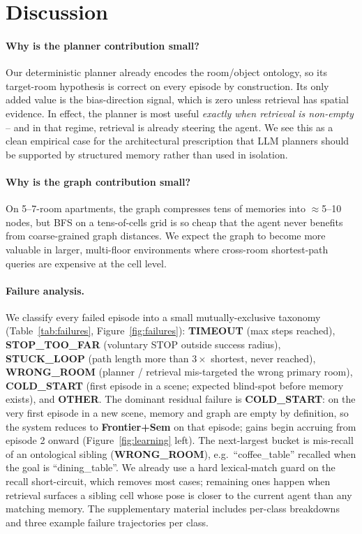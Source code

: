 \documentclass[conference,a4paper,10pt]{IEEEtran}
\begin{document}
\section{Discussion}

\paragraph{Why is the planner contribution small?}
Our deterministic planner already encodes the room/object ontology, so
its target-room hypothesis is correct on every episode by construction.
Its only added value is the bias-direction signal, which is zero unless
retrieval has spatial evidence. In effect, the planner is most useful
\emph{exactly when retrieval is non-empty} -- and in that regime,
retrieval is already steering the agent. We see this as a clean
empirical case for the architectural prescription that LLM planners
should be supported by structured memory rather than used in isolation.

\paragraph{Why is the graph contribution small?}
On 5--7-room apartments, the graph compresses tens of memories into
$\approx$5--10 nodes, but BFS on a tens-of-cells grid is so cheap that
the agent never benefits from coarse-grained graph distances. We expect
the graph to become more valuable in larger, multi-floor environments
where cross-room shortest-path queries are expensive at the cell level.

\paragraph{Failure analysis.}
We classify every failed episode into a small mutually-exclusive
taxonomy (Table~\ref{tab:failures}, Figure~\ref{fig:failures}):
\textbf{TIMEOUT} (max steps reached), \textbf{STOP\_TOO\_FAR} (voluntary
STOP outside success radius), \textbf{STUCK\_LOOP} (path length more than
$3\times$ shortest, never reached), \textbf{WRONG\_ROOM} (planner /
retrieval mis-targeted the wrong primary room), \textbf{COLD\_START}
(first episode in a scene; expected blind-spot before memory exists), and
\textbf{OTHER}. The dominant residual failure is \textbf{COLD\_START}:
on the very first episode in a new scene, memory and graph are empty by
definition, so the system reduces to \textbf{Frontier+Sem} on that
episode; gains begin accruing from episode 2 onward
(Figure~\ref{fig:learning} left). The next-largest bucket is mis-recall
of an ontological sibling (\textbf{WRONG\_ROOM}), e.g.\
``coffee\_table'' recalled when the goal is ``dining\_table''. We
already use a hard lexical-match guard on the recall short-circuit,
which removes most cases; remaining ones happen when retrieval surfaces
a sibling cell whose pose is closer to the current agent than any
matching memory. The supplementary material includes per-class breakdowns
and three example failure trajectories per class.
\end{document}
